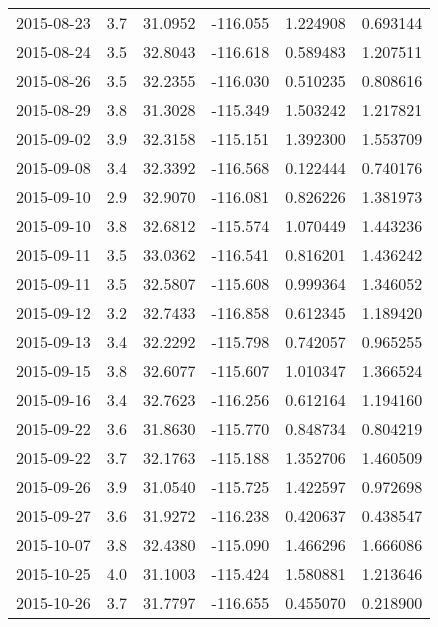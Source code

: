 \begin{tabular}{lrrrrr}
2015-08-23 &       3.7 &  31.0952 &  -116.055 &         1.224908 &         0.693144 \\
2015-08-24 &       3.5 &  32.8043 &  -116.618 &         0.589483 &         1.207511 \\
2015-08-26 &       3.5 &  32.2355 &  -116.030 &         0.510235 &         0.808616 \\
2015-08-29 &       3.8 &  31.3028 &  -115.349 &         1.503242 &         1.217821 \\
2015-09-02 &       3.9 &  32.3158 &  -115.151 &         1.392300 &         1.553709 \\
2015-09-08 &       3.4 &  32.3392 &  -116.568 &         0.122444 &         0.740176 \\
2015-09-10 &       2.9 &  32.9070 &  -116.081 &         0.826226 &         1.381973 \\
2015-09-10 &       3.8 &  32.6812 &  -115.574 &         1.070449 &         1.443236 \\
2015-09-11 &       3.5 &  33.0362 &  -116.541 &         0.816201 &         1.436242 \\
2015-09-11 &       3.5 &  32.5807 &  -115.608 &         0.999364 &         1.346052 \\
2015-09-12 &       3.2 &  32.7433 &  -116.858 &         0.612345 &         1.189420 \\
2015-09-13 &       3.4 &  32.2292 &  -115.798 &         0.742057 &         0.965255 \\
2015-09-15 &       3.8 &  32.6077 &  -115.607 &         1.010347 &         1.366524 \\
2015-09-16 &       3.4 &  32.7623 &  -116.256 &         0.612164 &         1.194160 \\
2015-09-22 &       3.6 &  31.8630 &  -115.770 &         0.848734 &         0.804219 \\
2015-09-22 &       3.7 &  32.1763 &  -115.188 &         1.352706 &         1.460509 \\
2015-09-26 &       3.9 &  31.0540 &  -115.725 &         1.422597 &         0.972698 \\
2015-09-27 &       3.6 &  31.9272 &  -116.238 &         0.420637 &         0.438547 \\
2015-10-07 &       3.8 &  32.4380 &  -115.090 &         1.466296 &         1.666086 \\
2015-10-25 &       4.0 &  31.1003 &  -115.424 &         1.580881 &         1.213646 \\
2015-10-26 &       3.7 &  31.7797 &  -116.655 &         0.455070 &         0.218900 \\

\end{tabular}
